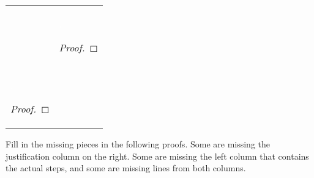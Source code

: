 \begin{exercises}
\begin{longtabu}{X[1.4]X[1]}
&

\item \textcolor{white}{.}  
\vspace{-16pt}
\begin{proof}
	 
	 
	 
	 
	\end{proof} 

\\
\vspace{-1cm}
\item \textcolor{white}{.}  
\vspace{-16pt}
	\begin{proof}
		
	 
	 
	 
	 
	 
	 
	 
	 
	 
	 
	 
	\end{proof}

\end{longtabu}
\end{exercises}

\noindent\problempart \label{pr.justifySLproof} Fill in the missing pieces in the following proofs. Some are missing the justification column on the right. Some are missing the left column that contains the actual steps, and some are missing lines from both columns.

